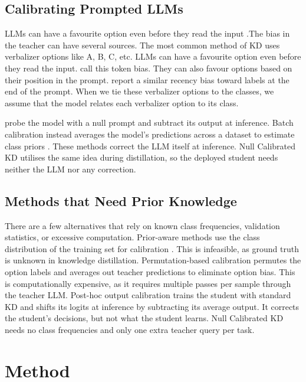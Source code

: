 \documentclass[11pt]{article}
\begin{document}
\subsection{Calibrating Prompted LLMs}

LLMs can have a favourite option even before they read the input \citep{zheng2024large}.The bias in the teacher can have several sources.
The most common method of KD uses verbalizer options like A, B, C, etc.
LLMs can have a favourite option even before they read the input.
\citet{zheng2024large} call this token bias.
They can also favour options based on their position in the prompt.
\citet{zhao2021calibrate} report a similar recency bias toward labels at the end of the prompt.
When we tie these verbalizer options to the classes, we assume that the model relates each verbalizer option to its class.

\citet{zhao2021calibrate} probe the model with a null prompt and subtract its output at inference.
Batch calibration instead averages the model's predictions across a dataset to estimate class priors \citep{zhou2024batch}.
These methods correct the LLM itself at inference.
Null Calibrated KD utilises the same idea during distillation, so the deployed student needs neither the LLM nor any correction.

\subsection{Methods that Need Prior Knowledge}

There are a few alternatives that rely on known class frequencies, validation statistics, or excessive computation.
Prior-aware methods use the class distribution of the training set for calibration \citep{menon2021longtail}.
This is infeasible, as ground truth is unknown in knowledge distillation.
Permutation-based calibration permutes the option labels and averages out teacher predictions to eliminate option bias.
This is computationally expensive, as it requires multiple passes per sample through the teacher LLM.
Post-hoc output calibration trains the student with standard KD and shifts its logits at inference by subtracting its average output.
It corrects the student's decisions, but not what the student learns.
Null Calibrated KD needs no class frequencies and only one extra teacher query per task.

\section{Method}
\end{document}
